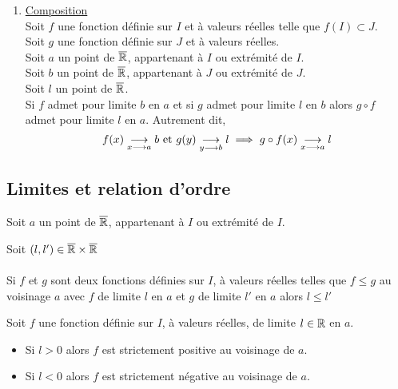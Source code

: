 \begin{defprop}
\begin{enumerate}
\begin{enumerate}
            \end{enumerate}
        \item \underline{Composition}\\
            Soit \(f\) une fonction définie sur \(I\) et à valeurs réelles telle que \(f (I) \subset J\).\\
            Soit \(g\) une fonction définie sur \(J\) et à valeurs réelles.\\
            Soit \(a\) un point de \(\overline{\mathbb{R}}\), appartenant à \(I\) ou extrémité de \(I\).\\
            Soit \(b\) un point de \(\overline{\mathbb{R}}\), appartenant à \(J\) ou extrémité de \(J\).\\
            Soit \(l\) un point de \(\overline{\mathbb{R}}\).\\
            Si \(f\) admet pour limite \(b\) en \(a\) et si \(g\) admet pour limite \(l\) en \(b\) alors \(g \circ f\) admet pour limite \(l\) en \(a\). Autrement dit,
            \[f(x) \underset{x\longrightarrow a}{\longrightarrow} b \text{ et } g(y) \underset{y\longrightarrow b}{\longrightarrow} l \implies g \circ f (x)\underset{x\longrightarrow a}{\longrightarrow} l\]
    \end{enumerate}
\end{defprop}

\subsection{Limites et relation d’ordre}
Soit \(a\) un point de \(\overline{\mathbb{R}}\), appartenant à \(I\) ou extrémité de \(I\).
\begin{defprop}
    Soit \((l,l')\in \overline{\mathbb{R}} \times \overline{\mathbb{R}}\)\\~\\
    Si \(f\) et \(g\) sont deux fonctions définies sur \(I\), à valeurs réelles telles que \(f\leq g\) au voisinage  \(a\) avec \(f\) de limite \(l\) en \(a\) et \(g\) de limite \(l'\) en \(a\) alors \(l \leq l'\)
\end{defprop}

\begin{defprop}
    Soit \(f\) une fonction définie sur \(I\), à valeurs réelles, de limite \(l \in \mathbb{R}\) en \(a\).
    \begin{itemize}
        \item Si \(l > 0\) alors \(f\) est strictement positive au voisinage de \(a\).
        \item Si \(l < 0\) alors \(f\) est strictement négative au voisinage de \(a\).
    \end{itemize}
\end{defprop}
